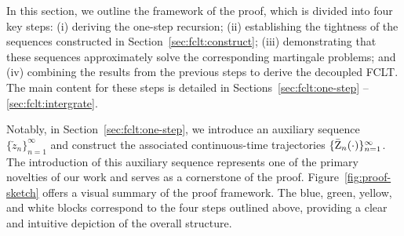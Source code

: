 \documentclass[11pt]{article}
\theoremstyle{plain}
\theoremstyle{definition}
\def\Figref#1{Figure~\ref{#1}}
\newcommand{\zcheck}{{\check{z}}}
\newcommand{\zbar}{{\bar{\textnormal{Z}}}}
\begin{document}
In this section, we outline the framework of the proof, which is divided into four key steps: (i) deriving the one-step recursion; (ii) establishing the tightness of the sequences constructed in Section~\ref{sec:fclt:construct}; (iii) demonstrating that these sequences approximately solve the corresponding martingale problems; and (iv) combining the results from the previous steps to derive the decoupled FCLT.
The main content for these steps is detailed in Sections~\ref{sec:fclt:one-step} -- \ref{sec:fclt:intergrate}. 

Notably, in Section~\ref{sec:fclt:one-step}, we introduce an auxiliary sequence $\{ \zcheck_{n} \}_{n=1}^\infty$ and construct the associated continuous-time trajectories $\{ \zbar_{n}(\cdot) \}_{n=1}^\infty$. The introduction of this auxiliary sequence represents one of the primary novelties of our work and serves as a cornerstone of the proof. \Figref{fig:proof-sketch} offers a visual summary of the proof framework. The blue, green, yellow, and white blocks correspond to the four steps outlined above, providing a clear and intuitive depiction of the overall structure.
\end{document}
